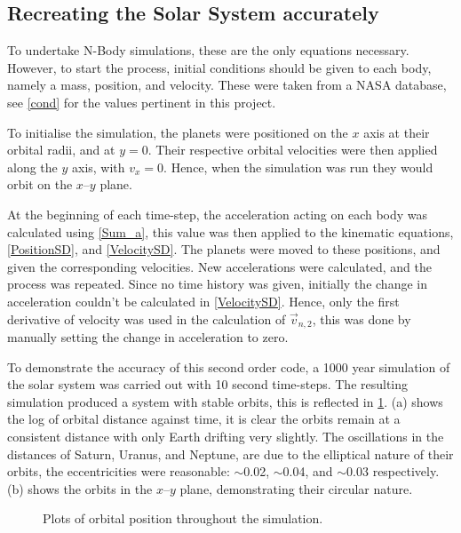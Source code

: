\documentclass[a4paper,10pt]{article}
\begin{document}
\subsection{Recreating the Solar System accurately}

To undertake N-Body simulations, these are the only equations necessary. However, to start the process, initial conditions should be given to each body, namely a mass, position, and velocity. These were taken from a NASA database\cite{PlanetFacts}, see \cref{cond} for the values pertinent in this project.  

To initialise the simulation, the planets were positioned on the $x$ axis at their orbital radii, and at $y=0$. Their respective orbital velocities were then applied along the $y$ axis, with $v_x = 0$. Hence, when the simulation was run they would orbit on the $x$--$y$ plane. 

At the beginning of each time-step, the acceleration acting on each body was calculated using \cref{Sum_a}, this value was then applied to the kinematic equations, \cref{PositionSD}, and \cref{VelocitySD}. The planets were moved to these positions, and given the corresponding velocities. New accelerations were calculated, and the process was repeated. Since no time history was given, initially the change in acceleration couldn't be calculated in \cref{VelocitySD}. Hence, only the first derivative of velocity was used in the calculation of $\vec v_{n,2}$, this was done by manually setting the change in acceleration to zero.

To demonstrate the accuracy of this second order code, a 1000 year simulation of the solar system was carried out with 10 second time-steps. The resulting simulation produced a system with stable orbits, this is reflected in \cref{Distance}.  (a) shows the log of orbital distance against time, it is clear the orbits remain at a consistent distance with only Earth drifting very slightly. The oscillations in the distances of Saturn, Uranus, and Neptune, are due to the elliptical nature of their orbits, the eccentricities were reasonable: $\sim$0.02, $\sim$0.04, and $\sim$0.03 respectively.  (b) shows the orbits in the $x$--$y$ plane, demonstrating their circular nature.

\begin{figure}[h!]
    \centering
    \qquad
    \caption{Plots of orbital position throughout the simulation.}%
    \label{Distance}%
\end{figure}
\end{document}
